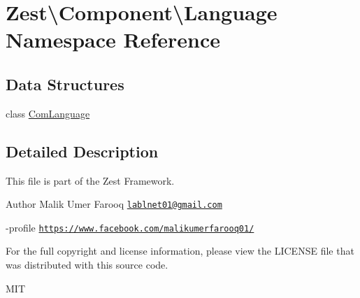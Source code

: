 \hypertarget{namespace_zest_1_1_component_1_1_language}{}\section{Zest\textbackslash{}Component\textbackslash{}Language Namespace Reference}
\label{namespace_zest_1_1_component_1_1_language}
\subsection*{Data Structures}
\begin{DoxyCompactItemize}
\item 
class \mbox{\hyperlink{class_zest_1_1_component_1_1_language_1_1_com_language}{Com\+Language}}
\end{DoxyCompactItemize}


\subsection{Detailed Description}
This file is part of the Zest Framework.

\begin{DoxyAuthor}{Author}
Malik Umer Farooq \href{mailto:lablnet01@gmail.com}{\tt lablnet01@gmail.\+com} 

-\/profile \href{https://www.facebook.com/malikumerfarooq01/}{\tt https\+://www.\+facebook.\+com/malikumerfarooq01/}
\end{DoxyAuthor}
For the full copyright and license information, please view the L\+I\+C\+E\+N\+SE file that was distributed with this source code.

M\+IT 